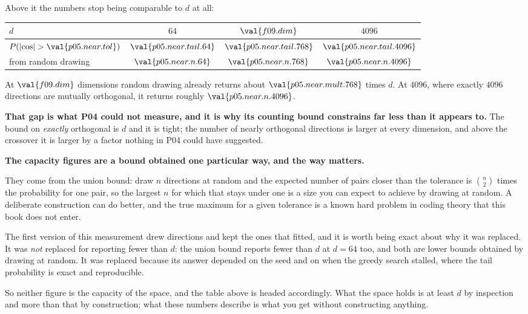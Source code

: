 \begin{fr}
Above it the numbers stop being comparable to $d$ at all:

\begin{center}
\begin{tabular}{lccc}
\toprule
$d$ & $64$ & $\val{f09.dim}$ & $4096$ \\
\midrule
$P(\lvert\cos\rvert > \val{p05.near.tol})$ & $\val{p05.near.tail.64}$ &
  $\val{p05.near.tail.768}$ & $\val{p05.near.tail.4096}$ \\
from random drawing & $\val{p05.near.n.64}$ & $\val{p05.near.n.768}$ &
  $\val{p05.near.n.4096}$ \\
\bottomrule
\end{tabular}
\end{center}

At $\val{f09.dim}$ dimensions random drawing already returns about
$\val{p05.near.mult.768}$ times $d$. At $4096$, where exactly $4096$ directions
are mutually orthogonal, it returns roughly $\val{p05.near.n.4096}$.

\textbf{That gap is what P04 could not measure, and it is why its counting
bound constrains far less than it appears to.} The bound on \emph{exactly}
orthogonal is $d$ and it is tight; the number of nearly orthogonal directions
is larger at every dimension, and above the crossover it is larger by a factor
nothing in P04 could have suggested.
\end{fr}

\begin{fr}
\begin{rigourbox}
\textbf{The capacity figures are a bound obtained one particular way, and the
way matters.}

They come from the union bound: draw $n$ directions at random and the expected
number of pairs closer than the tolerance is $\binom{n}{2}$ times the
probability for one pair, so the largest $n$ for which that stays under one is
a size you can expect to achieve by drawing at random. A deliberate
construction can do better, and the true maximum for a given tolerance is a
known hard problem in coding theory that this book does not enter.

The first version of this measurement drew directions and kept the ones that
fitted, and it is worth being exact about why it was replaced. It was
\emph{not} replaced for reporting fewer than $d$: the union bound reports fewer
than $d$ at $d = 64$ too, and both are lower bounds obtained by drawing at
random. It was replaced because its answer depended on the seed and on when the
greedy search stalled, where the tail probability is exact and reproducible.

So neither figure is the capacity of the space, and the table above is headed
accordingly. What the space holds is at least $d$ by inspection and more than
that by construction; what these numbers describe is what you get without
constructing anything.
\end{rigourbox}
\end{fr}

